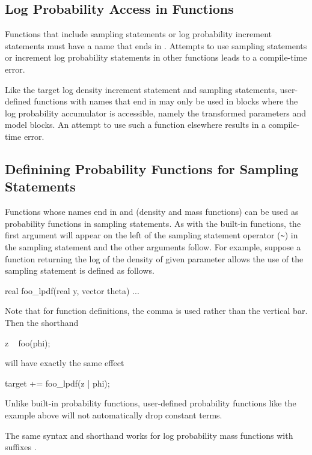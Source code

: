 \subsection{Log Probability Access in Functions}

Functions that include sampling statements or log probability
increment statements must have a name that ends in .
Attempts to use sampling statements or increment log probability
statements in other functions leads to a compile-time error.

Like the target log density increment statement and sampling
statements, user-defined functions with names that end in 
may only be used in blocks where the log probability accumulator is
accessible, namely the transformed parameters and model blocks.  An
attempt to use such a function elsewhere results in a compile-time
error.

\subsection{Definining Probability Functions for Sampling Statements}

Functions whose names end in  and  (density
and mass functions) can be used as probability functions in sampling
statements.  As with the built-in functions, the first argument will
appear on the left of the sampling statement operator (\Verb|~|) in
the sampling statement and the other arguments follow.  For example,
suppose a function returning the log of the density of  given
parameter  allows the use of the sampling statement is
defined as follows.
%
\begin{stancode}
real foo_lpdf(real y, vector theta) { ... }
\end{stancode}
%
Note that for function definitions, the comma is used rather than the
vertical bar.  Then the shorthand
%
\begin{stancode}
z ~ foo(phi);
\end{stancode}
%
will have exactly the same effect
%
\begin{stancode}
target += foo_lpdf(z | phi);
\end{stancode}
%
Unlike built-in probability functions, user-defined
probability functions like the example  above will not
automatically drop constant terms.

The same syntax and shorthand works for log probability mass functions
with suffixes .

